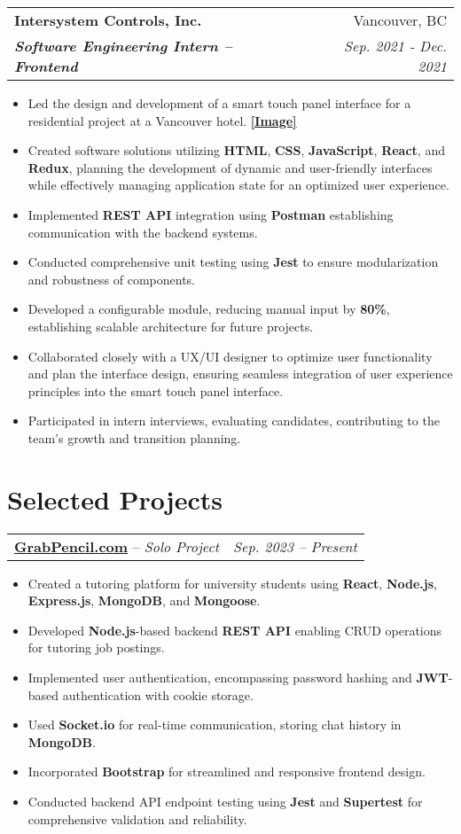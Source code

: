 \documentclass[letterpaper,11pt]{article}
\makeatletter
\newcommand{\resumeItemUpdated}[1]{
  \item\small{
    {#1 \vspace{-7pt}}
  }
}
\newcommand{\resumeSubheading}[4]{
  \vspace{-1pt}
    \begin{tabular*}{1\textwidth}{l@{\extracolsep{\fill}}r}
      \textbf{#1} & #2 \\
      \textbf{{\small\textit{#3}}} & {\small \textit{#4}} \\
    \end{tabular*}\vspace{-5pt}
}
\newcommand{\projectSubheading}[3]{
  \vspace{-1pt}
    \begin{tabular*}{1\textwidth}{l@{\extracolsep{\fill}}r}
      \textbf{#1} -- {\textit{#2}} & #3 \\
    \end{tabular*}\vspace{-5pt}
}
\newcommand{\resumeItemListStart}{\begin{itemize}[leftmargin=*]}
\newcommand{\resumeItemListEnd}{\end{itemize}\vspace{-5pt}}
\makeatother
\begin{document}
    \resumeSubheading
      {Intersystem Controls, Inc.}{Vancouver, BC}
      {Software Engineering Intern -- Frontend}{Sep. 2021 - Dec. 2021}
      \resumeItemListStart
        \resumeItemUpdated
          {Led the design and development of a smart touch panel interface for a residential project at a Vancouver hotel. \href{https://github.com/jayhonglee/Jaehong-Lee-s-Resume/blob/main/img/Calista_UI1.jpg?raw=true}{\textbf{[Image]}}}
        \resumeItemUpdated
          {Created software solutions utilizing \textbf{HTML}, \textbf{CSS}, \textbf{JavaScript}, \textbf{React}, and \textbf{Redux}, planning the development of dynamic and user-friendly interfaces while effectively managing application state for an optimized user experience.}
        \resumeItemUpdated
          {Implemented \textbf{REST API} integration using \textbf{Postman} establishing communication with the backend systems.}
        \resumeItemUpdated
          {Conducted comprehensive unit testing using \textbf{Jest} to ensure modularization and robustness of components.}
        \resumeItemUpdated
          {Developed a configurable module, reducing manual input by \textbf{80\%}, establishing scalable architecture for future projects.}
        \resumeItemUpdated
          {Collaborated closely with a UX/UI designer to optimize user functionality and plan the interface design, ensuring seamless integration of user experience principles into the smart touch panel interface.}
        \resumeItemUpdated
          {Participated in intern interviews, evaluating candidates, contributing to the team's growth and  transition planning.}
      \resumeItemListEnd

\section{Selected Projects}
 \projectSubheading
      {\href{https://grabpencil.com/}{GrabPencil.com}}{Solo Project}{\textit{\small Sep. 2023 -- Present}}
      \resumeItemListStart
        \resumeItemUpdated
          {Created a tutoring platform for university students using \textbf{React}, \textbf{Node.js}, \textbf{Express.js}, \textbf{MongoDB}, and \textbf{Mongoose}.}
        \resumeItemUpdated
          {Developed \textbf{Node.js}-based backend \textbf{REST API} enabling CRUD operations for tutoring job postings.}
        \resumeItemUpdated
          {Implemented user authentication, encompassing password hashing and \textbf{JWT}-based authentication with cookie storage.}
        \resumeItemUpdated
          {Used \textbf{Socket.io} for real-time communication, storing chat history in \textbf{MongoDB}.}
        \resumeItemUpdated
          {Incorporated \textbf{Bootstrap} for streamlined and responsive frontend design.}
        \resumeItemUpdated
          {Conducted backend API endpoint testing using \textbf{Jest} and \textbf{Supertest} for comprehensive validation and reliability.}
      \resumeItemListEnd
      
\end{document}

